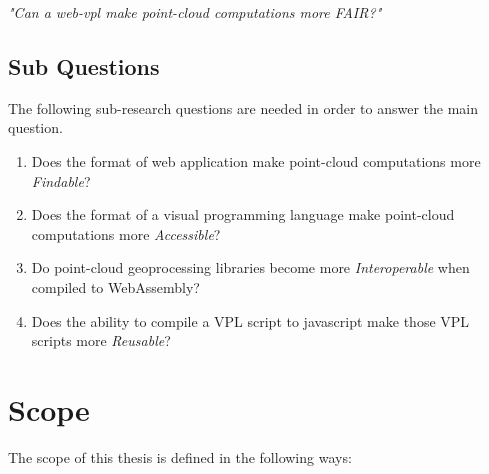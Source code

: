 \textit{"Can a web-vpl make point-cloud computations more FAIR?"}



\subsection*{Sub Questions}
The following sub-research questions are needed in order to answer the main question. 









\begin{enumerate}[a]
  \item Does the format of web application make point-cloud computations more \emph{Findable}?  
  \item Does the format of a visual programming language make point-cloud computations more \emph{Accessible}?  
  \item Do point-cloud geoprocessing libraries become more \emph{Interoperable} when compiled to WebAssembly?  
  \item Does the ability to compile a VPL script to javascript make those VPL scripts more \emph{Reusable}?  
\end{enumerate}



\newpage
\section{Scope}
The scope of this thesis is defined in the following ways: 


